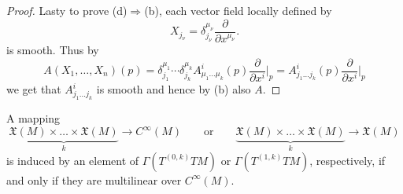 \begin{proof}
Lasty to prove (d)$\Rightarrow$(b), each vector field locally defined by 
\begin{equation*}
X_{j_\nu} = \delta^{\mu_\nu}_{j_\nu} \frac{\partial}{\partial x^{\mu_\nu}}.
\end{equation*}
\noindent is smooth. Thus by
\begin{equation*}
A(X_1,\dots,X_n)(p) = \delta^{\mu_1}_{j_1} \cdots \delta^{\mu_k}_{j_k} A^i_{\mu_1 \dots \mu_k}(p)\frac{\partial}{\partial x^i}\bigg\vert_p = A^i_{j_1\dots j_k}(p)\frac{\partial}{\partial x^i}\bigg\vert_p
\end{equation*}
\noindent we get that $A^i_{j_1 \dots j_k}$ is smooth and hence by (b) also $A$.
\end{proof}

\begin{theorem}
A mapping
\begin{equation*}
\underbrace{\mathfrak{X}(M) \times \dots \times \mathfrak{X}(M)}_{k} \to C^\infty(M) \qquad \text{or} \qquad \underbrace{\mathfrak{X}(M) \times \dots \times \mathfrak{X}(M)}_{k} \to \mathfrak{X}(M)
\end{equation*}
\noindent is induced by an element of $\Gamma(T^{(0,k)}TM)$ or $\Gamma(T^{(1,k)}TM)$, respectively, if and only if they are multilinear over $C^\infty(M)$.
\label{thm:tensor_char}
\end{theorem}

